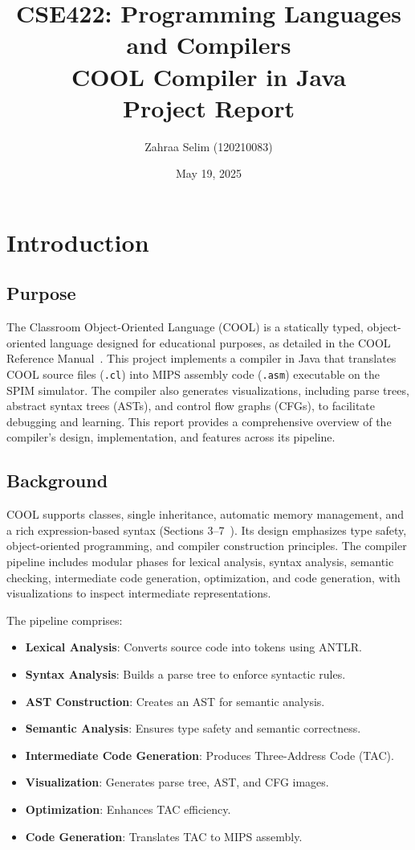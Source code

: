 \documentclass[11pt, titlepage]{article}
\title{CSE422: Programming Languages and Compilers\\COOL Compiler in Java\\Project Report}
\author{Zahraa Selim (120210083)}
\date{May 19, 2025}
\begin{document}
\maketitle
\tableofcontents
\newpage

\section{Introduction}
\label{sec:introduction}

\subsection{Purpose}
The Classroom Object-Oriented Language (COOL) is a statically typed, object-oriented language designed for educational purposes, as detailed in the COOL Reference Manual~\cite{cool_manual}. This project implements a compiler in Java that translates COOL source files (\texttt{.cl}) into MIPS assembly code (\texttt{.asm}) executable on the SPIM simulator. The compiler also generates visualizations, including parse trees, abstract syntax trees (ASTs), and control flow graphs (CFGs), to facilitate debugging and learning. This report provides a comprehensive overview of the compiler's design, implementation, and features across its pipeline.

\subsection{Background}
COOL supports classes, single inheritance, automatic memory management, and a rich expression-based syntax (Sections 3--7~\cite{cool_manual}). Its design emphasizes type safety, object-oriented programming, and compiler construction principles. The compiler pipeline includes modular phases for lexical analysis, syntax analysis, semantic checking, intermediate code generation, optimization, and code generation, with visualizations to inspect intermediate representations.

The pipeline comprises:
\begin{itemize}[leftmargin=*]
    \item \textbf{Lexical Analysis}: Converts source code into tokens using ANTLR.
    \item \textbf{Syntax Analysis}: Builds a parse tree to enforce syntactic rules.
    \item \textbf{AST Construction}: Creates an AST for semantic analysis.
    \item \textbf{Semantic Analysis}: Ensures type safety and semantic correctness.
    \item \textbf{Intermediate Code Generation}: Produces Three-Address Code (TAC).
    \item \textbf{Visualization}: Generates parse tree, AST, and CFG images.
    \item \textbf{Optimization}: Enhances TAC efficiency.
    \item \textbf{Code Generation}: Translates TAC to MIPS assembly.
\end{itemize}
\end{document}
